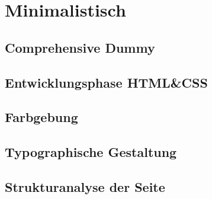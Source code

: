 \section{Minimalistisch}

	\subsection{Comprehensive Dummy}

	\subsection{Entwicklungsphase HTML&CSS}

	\subsection{Farbgebung}

	\subsection{Typographische Gestaltung}

	\subsection{Strukturanalyse der Seite}